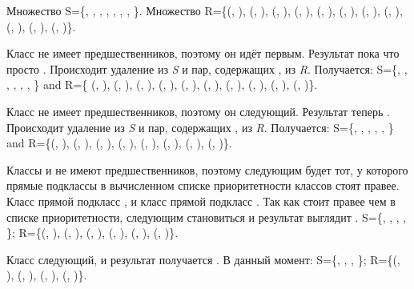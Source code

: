 \begin{flushleft}

Множество
S=\{,
,
,
,
,
,
,
\}.
Множество
R=\{(,
),
(,
),
(,
),
(,
),
(,
),
(,
),
(,
),
(,
),
(,
),
(,
),
(,
)\}.

Класс  не имеет предшественников, поэтому он идёт первым. Результат
пока что просто . Происходит удаление  из \emph{S} и пар,
содержащих , из \emph{R}. Получается:
S=\{,
,
,
,
,
,
\} and R=\{
(,
),
(,
),
(,
),
(,
),
(,
),
(,
),
(,
),
(,
),
(,
),
(,
)\}.

Класс  не имеет предшественников, поэтому он следующий. Результат
теперь . Происходит удаление  из \emph{S} и пар,
содержащих , из \emph{R}. Получается:
S=\{,
,
,
,
,
\} and R=\{(,
),
(,
),
(,
),
(,
),
(,
),
(,
),
(,
),
(,
)\}.

Классы  и  не имеют предшественников, поэтому следующим
будет тот, у которого прямые подклассы в вычисленном списке приоритетности
классов стоят правее. Класс  прямой подкласс , и класс
 прямой подкласс . Так как  стоит правее чем
 в списке приоритетности, следующим становиться  и
результат выглядит . 
S=\{,
,
,
,
\}; R=\{(,
),
(,
),
(,
),
(,
),
(,
),
(,
)\}.

Класс  следующий, и результат получается . В данный момент:
 S=\{,
,
,
\}; R=\{(,
),
(,
),
(,
),
(,
)\}.
\end{flushleft}

